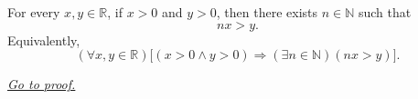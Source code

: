 \begin{theorem}
\label{thm:archimedean-property}
For every $x,y\in\mathbb{R}$, if $x>0$ and $y>0$, then there exists
$n\in\mathbb{N}$ such that
\[
  nx>y.
\]
Equivalently,
\[
  (\forall x,y\in\mathbb{R})
  \bigl[(x>0\land y>0)\Longrightarrow(\exists n\in\mathbb{N})(nx>y)\bigr].
\]

\smallskip
\noindent
\hyperref[prf:archimedean-property]{\textit{Go to proof.}}
\end{theorem}
